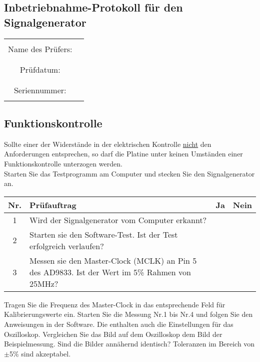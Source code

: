 \begin{center}
\section{Inbetriebnahme-Protokoll für den Signalgenerator}

	\begin{tabular}{|c|p{10cm}|}
		\hline
		& \\
		Name des Prüfers: &  \\
		& \\
		\hline
		& \\
		Prüfdatum: & \\
		& \\
		\hline
		& \\
		Seriennummer: & \\
		& \\
		\hline
	\end{tabular}
\end{center}

\subsection{Funktionskontrolle}
Sollte einer der Widerstände in der elektrischen Kontrolle \underline{nicht} den Anforderungen entsprechen, so darf die Platine unter keinen Umständen einer Funktionskontrolle unterzogen werden.\\
Starten Sie das Testprogramm am Computer und stecken Sie den Signalgenerator an.
\begin{flushleft}
	\begin{tabular}{|c||p{10cm}|c|c|}
		\hline
		Nr. & Prüfauftrag & Ja & Nein\\
		\hline
		1 & Wird der Signalgenerator vom Computer erkannt? & & \\
		\hline
		2 & Starten sie den Software-Test. Ist der Test erfolgreich verlaufen? & & \\
		\hline
		3 & Messen sie den Master-Clock (MCLK) an Pin 5 des AD9833. Ist der Wert im 5\% Rahmen von 25MHz? & & \\
		\hline
	\end{tabular}
\end{flushleft}
Tragen Sie die Frequenz des Master-Clock in das entsprechende Feld für Kalibrierungswerte ein.
\medskip		
Starten Sie die Messung Nr.1 bis Nr.4 und folgen Sie den Anweisungen in der Software. Die enthalten auch die Einstellungen für das Oszilloskop. Vergleichen Sie das Bild auf dem Oszilloskop dem Bild der Beispielmessung. Sind die Bilder annähernd identisch? Toleranzen im Bereich von $\pm$5\% sind akzeptabel.

